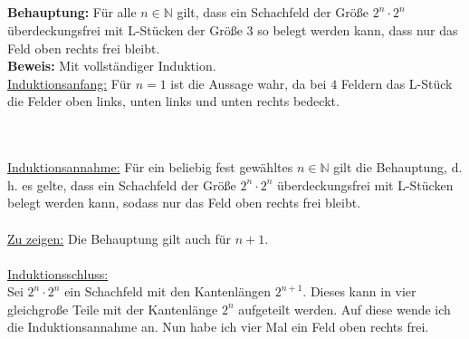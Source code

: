 \documentclass[10pt,a4paper,oneside,ngerman,numbers=noenddot]{scrartcl}
\begin{document}
\subsection{}
\textbf{Behauptung:} Für alle $n \in \mathbb{N}$ gilt, dass ein Schachfeld der Größe $2^{n} \cdot 2^{n}$ überdeckungsfrei mit L-Stücken der Größe 3 so belegt werden kann, dass nur das Feld oben rechts frei bleibt.\\
\textbf{Beweis:} Mit vollständiger Induktion.\\
\underline{Induktionsanfang:} Für $n=1$ ist die Aussage wahr, da bei $4$ Feldern das L-Stück die Felder oben links, unten links und unten rechts bedeckt.
\\\\
\underline{Induktionsannahme:} Für ein beliebig fest gewähltes $n \in \mathbb{N}$ gilt die Behauptung, d. h. es gelte, dass ein Schachfeld der Größe $2^{n} \cdot 2^{n}$ überdeckungsfrei mit L-Stücken belegt werden kann, sodass nur das Feld oben rechts frei bleibt.\\\\
\underline{Zu zeigen:} Die Behauptung gilt auch für $n+1$.\\\\
\underline{Induktionsschluss:}\\
Sei $2^{n} \cdot 2^{n}$ ein Schachfeld mit den Kantenlängen $2^{n+1}$. Dieses kann in vier gleichgroße Teile mit der Kantenlänge $2^{n}$ aufgeteilt werden. Auf diese wende ich die Induktionsannahme an. Nun habe ich vier Mal ein Feld oben rechts frei.
\end{document}

